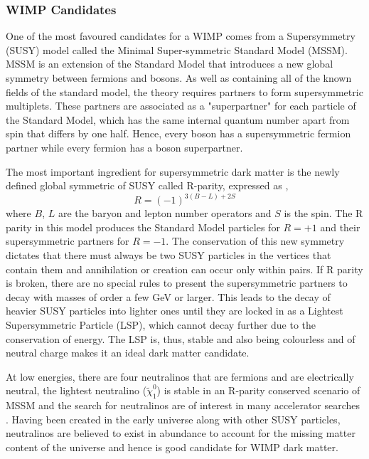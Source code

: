 \subsubsection{WIMP Candidates}
\label{subsubsec:wimp_candidates}

One of the most favoured candidates for a WIMP comes from a Supersymmetry (SUSY) model called the Minimal Super-symmetric Standard Model (MSSM). MSSM is an extension of the Standard Model that introduces a new global symmetry between fermions and bosons. As well as containing all of the known fields of the standard model, the theory requires partners to form supersymmetric multiplets. These partners are associated as a "superpartner" for each particle of the Standard Model, which has the same internal quantum number apart from spin that differs by one half. Hence, every boson has a supersymmetric fermion partner while every fermion has a boson superpartner. 

The most important ingredient for supersymmetric dark matter is the newly defined global symmetric of SUSY called R-parity, expressed as \cite{Jungman_1996},
%
\begin{equation} \label{eq:r_parity}
    R = (-1)^{3(B-L) + 2S}
\end{equation}
%
where $B$, $L$ are the baryon and lepton number operators and $S$ is the spin. The R parity in this model produces the Standard Model particles for $R=+1$ and their supersymmetric partners for $R=-1$. The conservation of this new symmetry dictates that there must always be two SUSY particles in the vertices that contain them and annihilation or creation can occur only within pairs. If R parity is broken, there are no special rules to present the supersymmetric partners to decay with masses of order a few GeV or larger. This leads to the decay of heavier SUSY particles into lighter ones until they are locked in as a Lightest Supersymmetric Particle (LSP), which cannot decay further due to the conservation of energy. The LSP is, thus, stable and also being colourless and of neutral charge makes it an ideal dark matter candidate.

At low energies, there are four neutralinos that are fermions and are electrically neutral, the lightest neutralino ($\tilde{\chi}^{0}_{1}$) is stable in an R-parity conserved scenario of MSSM and the search for neutralinos are of interest in many accelerator searches \cite{Athron_2019}. Having been created in the early universe along with other SUSY particles, neutralinos are believed to exist in abundance to account for the missing matter content of the universe and hence is good candidate for WIMP dark matter. 


